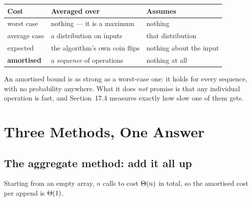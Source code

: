 \begin{alertbox}
\begin{longtable}{@{}L{2.8cm}L{5.4cm}L{5.8cm}@{}}
\toprule
{}
\textbf{Cost} & \textbf{Averaged over} & \textbf{Assumes} \\
\midrule
\endhead
worst case & nothing --- it is a maximum & nothing \\
average case & a distribution on inputs & that distribution \\
expected & the algorithm's own coin flips & nothing about the input \\
\textbf{amortised} & a \emph{sequence} of operations & nothing at all \\
\bottomrule
\end{longtable}

\smallskip
An amortised bound is as strong as a worst-case one: it holds for every
sequence, with no probability anywhere. What it does \emph{not} promise is that
any individual operation is fast, and Section~17.4 measures exactly how slow
one of them gets.
\end{alertbox}

\section{Three Methods, One Answer}


\subsection*{The aggregate method: add it all up}

\begin{theorem}\label{thm:doubling}
Starting from an empty array, $n$ calls to  cost $\Theta(n)$ in
total, so the amortised cost per append is $\Theta(1)$.
\end{theorem}

